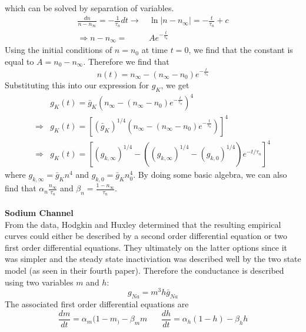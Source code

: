 \documentclass{article}
\newcommand{\od}[2]{\frac{d #1}{d #2}}
\numberwithin{equation}{section}
\begin{document}
which can be solved by separation of variables.
\begin{equation}
\begin{split}
    \frac{dn}{n-n_\infty} = -\frac{1}{\tau_n}dt \rightarrow & \, \ln|n-n_\infty| = -\frac{t}{\tau_n}+c
    \\ \Rightarrow n-n_\infty =& \, Ae^{-\frac{t}{\tau_n}}
\end{split}
\end{equation}
Using the initial conditions of $n=n_0$ at time $t=0$, we find that the constant is equal to $A=n_0 -n_\infty$. Therefore we find that 
\begin{equation}
    n(t)=n_\infty - (n_\infty - n_0)e^{-\frac{t}{\tau_n}}
\end{equation}
Substituting this into our expression for $g_K$, we get 
\begin{equation*}
\begin{split}
    &g_K(t)=\bar{g}_K(n_\infty-(n_\infty-n_0)e^{-\frac{t}{\tau_n}})^4 \\
    \Rightarrow &g_K(t) = \left[(\bar{g}_K )^{1/4} (n_\infty-(n_\infty-n_0)e^{-\frac{t}{\tau_n}})\right]^{4} \\
    \Rightarrow &g_K(t)=\left[ (g_{k,\infty})^{1/4}-( (g_{k,\infty})^{1/4}-(g_{k,0})^{1/4})e^{-t/\tau_n}      \right]^4
\end{split}
\end{equation*}
where $g_{k,\infty} = \bar{g}_Kn^4$ and $g_{k,0} = \bar{g}_Kn_0^4$. By doing some basic algebra, we can also find that $\alpha_n \frac{n_\infty}{\tau_n}$ and $\beta_n=\frac{1-n_\infty}{\tau_n}$.\\\\
\textbf{Sodium Channel}\\
From the data, Hodgkin and Huxley determined that the resulting empirical curves could either be described by a second order differential equation or two first order differential equations. They ultimately on the latter options since it was simpler and the steady state inactiviation was described well by the two state model (as seen in their fourth paper). Therefore the conductance is described using two variables $m$ and $h$:
\begin{equation}
    g_{Na} =m^3h\bar{g}_{Na} 
\end{equation}
The associated first order differential equations are 
\begin{equation}
    \od{m}{t} = \alpha_m (1-m_)-\beta_mm \hspace{20pt} \od{h}{t} = \alpha_h(1-h) -\beta_hh
\end{equation}
\end{document}

